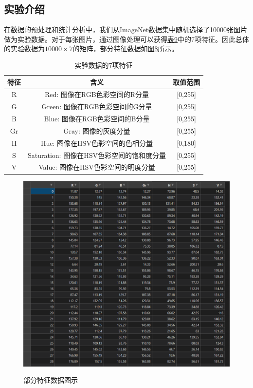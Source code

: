 \documentclass[UTF8]{ctexart}
\begin{document}
	\subsection{实验介绍}
	在数据的预处理和统计分析中，我们从ImageNet数据集中随机选择了10000张图片做为实验数据。对于每张图片，通过图像处理可以获得\hyperref[Chart.9]{表9}中的7项特征。因此总体的实验数据为$10000 \times 7$的矩阵，部分特征数据如\hyperref[Fig.8]{图8}所示。
	
	\begin{table}[htbp]
		\centering
		\caption{实验数据的7项特征}
		\begin{tabular}{ccc}
			\toprule
			特征 & 含义 & 取值范围 \\
			\midrule
			R & Red: 图像在RGB色彩空间的R分量 & [0,255] \\
			\midrule
			G & Green: 图像在RGB色彩空间的G分量 & [0,255] \\
			\midrule
			B & Blue: 图像在RGB色彩空间的B分量 & [0,255] \\
			\midrule
			Gr & Gray: 图像的灰度分量 & [0,255] \\
			\midrule
			H & Hue: 图像在HSV色彩空间的色相分量 & [0,180] \\
			\midrule
			S & Saturation: 图像在HSV色彩空间的饱和度分量 & [0,255] \\
			\midrule
			V & Value: 图像在HSV色彩空间的明度分量 & [0,255] \\
			\bottomrule
		\end{tabular}%
		\label{Chart.9}%
	\end{table}%

	\begin{figure}[htbp]
		\centering
		\caption{部分特征数据图示}
		\includegraphics[width=1.0\textwidth]{data_csv.png}
		\label{Fig.8}
	\end{figure}
\end{document}
